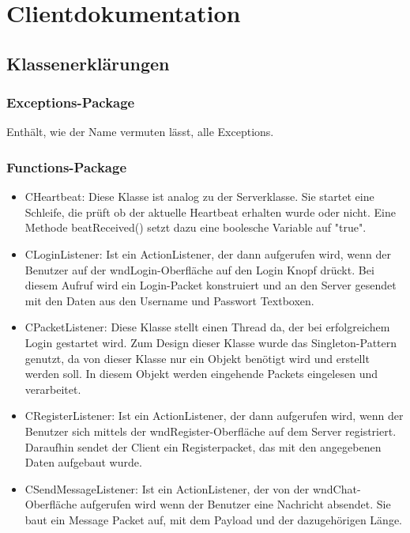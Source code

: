 \documentclass[a4paper,12pt]{scrartcl}
\begin{document}
\section{Clientdokumentation}
\subsection{Klassenerklärungen}
\subsubsection{Exceptions-Package}
Enthält, wie der Name vermuten lässt, alle Exceptions.

\subsubsection{Functions-Package}
\begin{itemize}
\item CHeartbeat: Diese Klasse ist analog zu der Serverklasse. Sie startet eine Schleife, die prüft ob der aktuelle Heartbeat erhalten wurde oder nicht. Eine Methode beatReceived() setzt dazu eine boolesche Variable auf "true".
\item CLoginListener: Ist ein ActionListener, der dann aufgerufen wird, wenn der Benutzer auf der wndLogin-Oberfläche auf den Login Knopf drückt. Bei diesem Aufruf wird ein Login-Packet konstruiert und an den Server gesendet mit den Daten aus den Username und Passwort Textboxen.
\item CPacketListener: Diese Klasse stellt einen Thread da, der bei erfolgreichem Login gestartet wird. Zum Design dieser Klasse wurde das Singleton-Pattern genutzt, da von dieser Klasse nur ein Objekt benötigt wird und erstellt werden soll. In diesem Objekt werden eingehende Packets eingelesen und verarbeitet.
\item CRegisterListener: Ist ein ActionListener, der dann aufgerufen wird, wenn der Benutzer sich mittels der wndRegister-Oberfläche auf dem Server registriert. Daraufhin sendet der Client ein Registerpacket, das mit den angegebenen Daten aufgebaut wurde.
\item CSendMessageListener: Ist ein ActionListener, der von der wndChat-Oberfläche aufgerufen wird wenn der Benutzer eine Nachricht absendet. Sie baut ein Message Packet auf, mit dem Payload und der dazugehörigen Länge.
\end{itemize}
\end{document}

